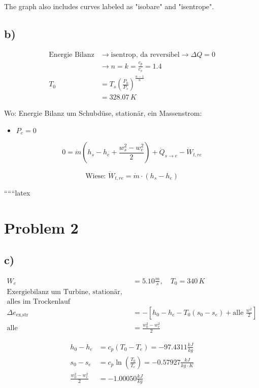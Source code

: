 The graph also includes curves labeled as "isobare" and "isentrope".

\subsection*{b)}

\begin{align*}
    \text{Energie Bilanz} &\rightarrow \text{isentrop, da reversibel} \rightarrow \Delta Q = 0 \\
    &\rightarrow n = k = \frac{c_p}{c_v} = 1.4 \\
    T_0 &= T_s \left( \frac{P_0}{P_s} \right)^{\frac{n-1}{n}} \\
    &= 328.07 \, K
\end{align*}

Wo: Energie Bilanz um Schubdüse, stationär, ein Massenstrom:
\begin{itemize}
    \item $P_e = 0$
\end{itemize}

\[
0 = \dot{m} \left( h_s - h_e + \frac{w_s^2 - w_e^2}{2} \right) + \dot{Q}_{s \rightarrow e} - \dot{W}_{t, re}
\]

\[
\text{Wiese: } \dot{W}_{t, re} = \dot{m} \cdot \left( h_s - h_e \right)
\]

``````latex

\section*{Problem 2}

\subsection*{c)}

\begin{align*}
W_e &= 5.10 \frac{m}{s}, \quad T_0 = 340 \, K \\
\text{Exergiebilanz um Turbine, stationär, 1 massenstrom:} \\
\text{alles im Trockenlauf} \\
\Delta e_{\text{ex,str}} &= -\left[ h_0 - h_e - T_0 \left( s_0 - s_e \right) + \text{alle } \frac{w^2}{2} \right] \\
\text{alle} &= \frac{w_0^2 - w_e^2}{2}
\end{align*}

\begin{align*}
h_0 - h_e &= c_p \left( T_0 - T_e \right) = -97.4311 \frac{kJ}{kg} \\
s_0 - s_e &= c_p \ln \left( \frac{T_0}{T_e} \right) = -0.57927 \frac{kJ}{kg \cdot K} \\
\frac{w_0^2 - w_e^2}{2} &= -1.00050 \frac{kJ}{kg}
\end{align*}

